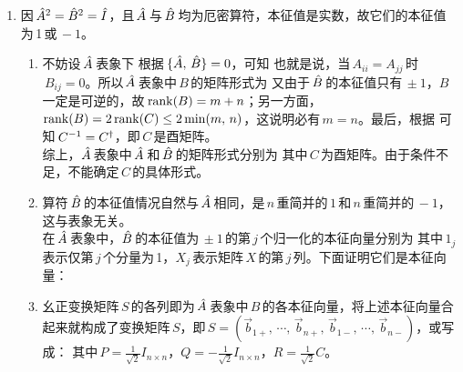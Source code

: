 \begin{enumerate}[label=2.\arabic*, leftmargin=-0.5mm]
\item
因$\,\hat{A}^2=\hat{B}^2=\hat{I}$，且$\,\hat{A}\,$与$\,\hat{B}\,$均为厄密算符，本征值是实数，故它们的本征值为\,1\,或$\,-1$。
\begin{enumerate}[label=(\arabic*)]
\item 
不妨设$\,\hat{A}\,$表象下
根据$\,\{\hat{A},\,\hat{B}\}=0$，可知
也就是说，当$\,A_{ii}=A_{jj}\,$时$\,B_{ij}=0$。所以$\,\hat{A}\,$表象中$\,B\,$的矩阵形式为
又由于$\,\hat{B}\,$的本征值只有$\,\pm1$，$B\,$一定是可逆的，故$\,\rank(B)=m+n$；另一方面，$\rank(B)=2\rank(C)\leq2\min(m,\,n)$，这说明必有$\,m=n$。最后，根据
可知$\,C^{-1}=C^\dagger$，即$\,C\,$是酉矩阵。\\
综上，$\hat{A}\,$表象中$\,\hat{A}\,$和$\,\hat{B}\,$的矩阵形式分别为
其中$\,C\,$为酉矩阵。由于条件不足，不能确定$\,C\,$的具体形式。
\setcounter{enumii}{2}
\item
算符$\,\hat{B}\,$的本征值情况自然与$\,\hat{A}\,$相同，是$\,n\,$重简并的$\,1\,$和$\,n\,$重简并的$\,-1$，这与表象无关。\\
在$\,\hat{A}\,$表象中，$\hat{B}\,$的本征值为$\,\pm1\,$的第$\,j\,$个归一化的本征向量分别为
其中$\,1_j\,$表示仅第$\,j\,$个分量为\,1，$X_j\,$表示矩阵$\,X\,$的第$\,j\,$列。下面证明它们是本征向量：
\setcounter{enumii}{4}
\item
幺正变换矩阵$\,S\,$的各列即为$\,\hat{A}\,$表象中$\,B\,$的各本征向量，将上述本征向量合起来就构成了变换矩阵$\,S$，即$\,S=(\vec{b}_{1+},\,\cdots,\,\vec{b}_{n+},\,\vec{b}_{1-},\,\cdots,\,\vec{b}_{n-})$，或写成：
其中$\,P=\frac{1}{\sqrt{2}}I_{n\times n}$，$Q=-\frac{1}{\sqrt{2}}I_{n\times n}$，$R=\frac{1}{\sqrt{2}}C$。\\

\end{enumerate}
\end{enumerate}
